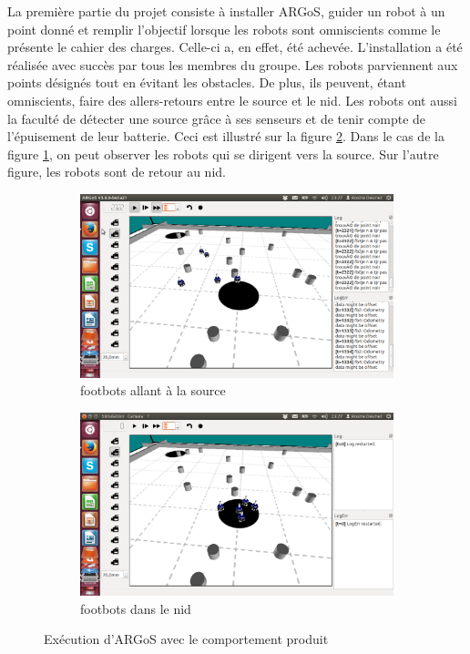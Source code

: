 \documentclass[a4paper]{report}
\begin{document}
La première partie du projet consiste à installer ARGoS, guider un robot à un point donné et remplir l'objectif lorsque les robots sont omniscients comme le présente le cahier des charges.\cite{cahierCharges} Celle-ci a, en effet, été achevée. L'installation a été réalisée avec succès par tous les membres du groupe. Les robots parviennent aux points désignés tout en évitant les obstacles. De plus, ils peuvent, étant omniscients, faire des allers-retours entre le source et le nid. Les robots ont aussi la faculté de détecter une source grâce à ses senseurs et de tenir compte de l'épuisement de leur batterie. Ceci est illustré sur la figure \ref{fig:ourArgos}. Dans le cas de la figure \ref{fig:argosNest}, on  peut observer les robots qui se dirigent vers la source. Sur l'autre figure, les robots sont  de retour au nid.

\begin{figure}[h!]
        \centering
        \begin{subfigure}[h!]{0.4\textwidth}
                \includegraphics[trim = 60mm 40mm 75mm 45mm, clip, width=\textwidth]{ourArgos1.png}
                \caption{footbots allant à la source}
        \end{subfigure}   \begin{subfigure}[h!]{0.4\textwidth}
                \includegraphics[trim = 60mm 40mm 75mm 45mm, clip, width=\textwidth]{ourArgos2.png}
                \caption{footbots dans le nid\label{fig:argosNest}}
        \end{subfigure}
        \caption{Exécution d'ARGoS avec le comportement produit\label{fig:ourArgos}}
\end{figure}
\end{document}
